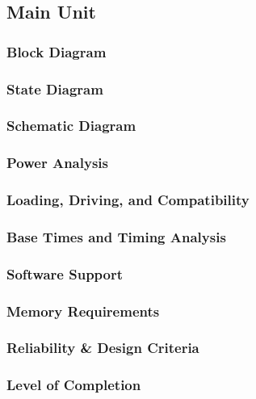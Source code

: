 \subsection{Main Unit}
\subsubsection{Block Diagram}
\subsubsection{State Diagram}
\subsubsection{Schematic Diagram}
\subsubsection{Power Analysis}
\subsubsection{Loading, Driving, and Compatibility}
\subsubsection{Base Times and Timing Analysis}
\subsubsection{Software Support}
\subsubsection{Memory Requirements}
\subsubsection{Reliability \& Design Criteria}
\subsubsection{Level of Completion}
